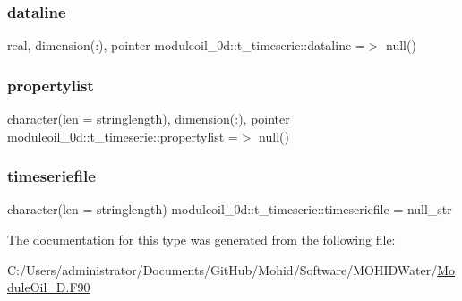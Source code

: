 \subsubsection{\texorpdfstring{dataline}{dataline}}
{\footnotesize\ttfamily real, dimension(\+:), pointer moduleoil\+\_\+0d\+::t\+\_\+timeserie\+::dataline =$>$ null()\hspace{0.3cm}{\ttfamily [private]}}

\mbox{\label{structmoduleoil__0d_1_1t__timeserie_aaf840bb78b08a061819357dd85b0ca9e}} 
\subsubsection{\texorpdfstring{propertylist}{propertylist}}
{\footnotesize\ttfamily character(len = stringlength), dimension(\+:), pointer moduleoil\+\_\+0d\+::t\+\_\+timeserie\+::propertylist =$>$ null()\hspace{0.3cm}{\ttfamily [private]}}

\mbox{\label{structmoduleoil__0d_1_1t__timeserie_a5cf27f4a4f82cad8fa311a2effa49b8a}} 
\subsubsection{\texorpdfstring{timeseriefile}{timeseriefile}}
{\footnotesize\ttfamily character(len = stringlength) moduleoil\+\_\+0d\+::t\+\_\+timeserie\+::timeseriefile = null\+\_\+str\hspace{0.3cm}{\ttfamily [private]}}



The documentation for this type was generated from the following file\+:\begin{DoxyCompactItemize}
\item 
C\+:/\+Users/administrator/\+Documents/\+Git\+Hub/\+Mohid/\+Software/\+M\+O\+H\+I\+D\+Water/\mbox{\hyperlink{_module_oil__0_d_8_f90}{Module\+Oil\+\_\+D.\+F90}}\end{DoxyCompactItemize}
